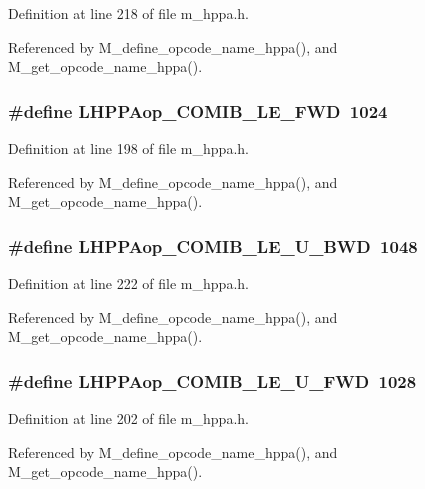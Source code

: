 Definition at line 218 of file m\_\-hppa.h.

Referenced by M\_\-define\_\-opcode\_\-name\_\-hppa(), and M\_\-get\_\-opcode\_\-name\_\-hppa().
\subsubsection{\setlength{\rightskip}{0pt plus 5cm}\#define LHPPAop\_\-COMIB\_\-LE\_\-FWD~1024}\label{m__hppa_8h_c83ba3dfcccf6d878a91ddbca24482de}




Definition at line 198 of file m\_\-hppa.h.

Referenced by M\_\-define\_\-opcode\_\-name\_\-hppa(), and M\_\-get\_\-opcode\_\-name\_\-hppa().
\subsubsection{\setlength{\rightskip}{0pt plus 5cm}\#define LHPPAop\_\-COMIB\_\-LE\_\-U\_\-BWD~1048}\label{m__hppa_8h_68f2272572e9be47746a14bd42c3e607}




Definition at line 222 of file m\_\-hppa.h.

Referenced by M\_\-define\_\-opcode\_\-name\_\-hppa(), and M\_\-get\_\-opcode\_\-name\_\-hppa().
\subsubsection{\setlength{\rightskip}{0pt plus 5cm}\#define LHPPAop\_\-COMIB\_\-LE\_\-U\_\-FWD~1028}\label{m__hppa_8h_9b16dd6118c77b143885815814326fc8}




Definition at line 202 of file m\_\-hppa.h.

Referenced by M\_\-define\_\-opcode\_\-name\_\-hppa(), and M\_\-get\_\-opcode\_\-name\_\-hppa().
